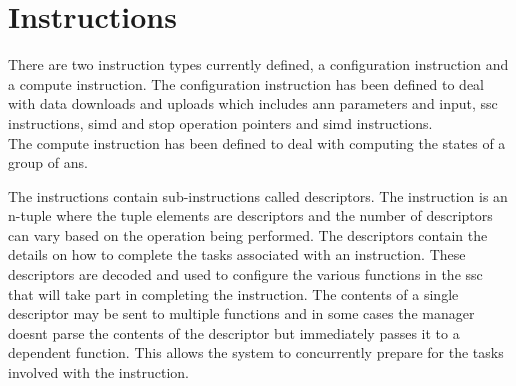 \fi
\section{Instructions}
\label{sec:Instructions}

There are two instruction types currently defined, a configuration instruction and a compute instruction.
The configuration instruction has been defined to deal with data downloads and uploads which includes \ac{ann} parameters and input, \ac{ssc} instructions, \ac{simd} and \ac{stop} operation pointers and \ac{simd} instructions.\\
The compute instruction has been defined to deal with computing the states of a group of \acp{an}. \par
\iffalse
\begin{outline}
  \lbbcleanspace
   \1 \ac{ann} parameters and input
   \1 \ac{ssc} instructions
   \1 \ac{simd} and \ac{stop} operation pointers
   \1 \ac{simd} instructions
\end{outline}
Typically an instruction contains information to process a group of \acp{an} but there are other instruction types to synchronize.
A group can be anywhere from one to 32 \acp{an} and is based on the number of execution lanes in the \ac{ssc} (see section \ref{sec:Processing a group of ANes}) and how the user partitions the \ac{ann} across the available \acp{ssc}.
\fi

The instructions contain sub-instructions called descriptors. 
The instruction is an n-tuple where the tuple elements are descriptors and the number of descriptors can vary based on the operation being performed. 
The descriptors contain the details on how to complete the tasks associated with an instruction.
These descriptors are decoded and used to configure the various functions in the \ac{ssc} that will take part in completing the instruction. 
The contents of a single descriptor may be sent to multiple functions and in some cases the manager doesnt parse the contents of the descriptor but immediately passes it to a dependent function.
This allows the system to concurrently prepare for the tasks involved with the instruction.

